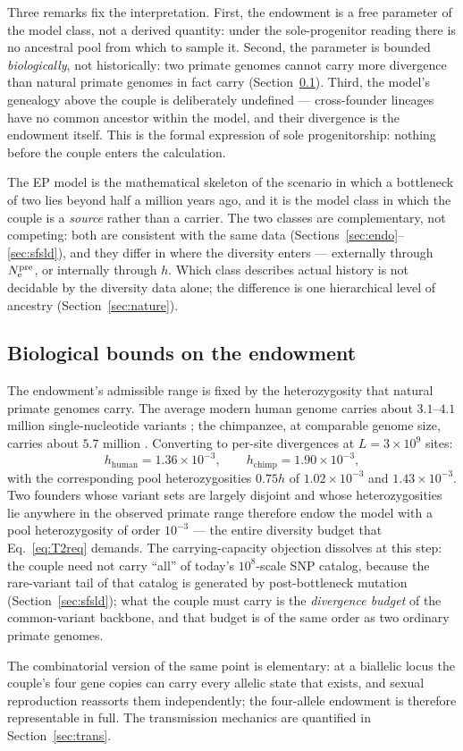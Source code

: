 Three remarks fix the interpretation. First, the endowment is a free
parameter of the model class, not a derived quantity: under the
sole-progenitor reading there is no ancestral pool from which to sample it.
Second, the parameter is bounded \emph{biologically}, not historically: two
primate genomes cannot carry more divergence than natural primate genomes
in fact carry (Section~\ref{sec:endocap}). Third, the model's genealogy
above the couple is deliberately undefined --- cross-founder lineages have
no common ancestor within the model, and their divergence is the endowment
itself. This is the formal expression of sole progenitorship: nothing
before the couple enters the calculation.

The EP model is the mathematical skeleton of the scenario in which a
bottleneck of two lies beyond half a million years ago, and
it is the model class in which the couple is a \emph{source} rather than a
carrier. The two classes are complementary, not competing: both are
consistent with the same data (Sections~\ref{sec:endo}--\ref{sec:sfsld}),
and they differ in where the diversity enters --- externally through
$N_{\mathrm{e}}^{\mathrm{pre}}$, or internally through $h$. Which class describes actual history
is not decidable by the diversity data alone; the difference is one
hierarchical level of ancestry (Section~\ref{sec:nature}).

\subsection{Biological bounds on the endowment}\label{sec:endocap}
The endowment's admissible range is fixed by the heterozygosity that
natural primate genomes carry. The average modern human genome carries
about $3.1$--$4.1$ million single-nucleotide variants
\citep{PradoMartinez2013,Auton2015}; the chimpanzee, at comparable genome
size, carries about $5.7$ million \citep{PradoMartinez2013}. Converting to
per-site divergences at $L = 3\times10^{9}$ sites:
\begin{equation}\label{eq:hbounds}
h_{\mathrm{human}} = 1.36\times10^{-3}, \qquad
h_{\mathrm{chimp}} = 1.90\times10^{-3},
\end{equation}
with the corresponding pool heterozygosities $0.75h$ of
$1.02\times10^{-3}$ and $1.43\times10^{-3}$. Two founders whose variant
sets are largely disjoint and whose heterozygosities lie anywhere in the
observed primate range therefore endow the model with a pool heterozygosity
of order $10^{-3}$ --- the entire diversity budget that
Eq.~\eqref{eq:T2req} demands. The carrying-capacity objection dissolves at
this step: the couple need not carry ``all'' of today's $10^8$-scale SNP
catalog, because the rare-variant tail of that catalog is generated by
post-bottleneck mutation (Section~\ref{sec:sfsld}); what the couple must
carry is the \emph{divergence budget} of the common-variant backbone, and
that budget is of the same order as two ordinary primate genomes.

The combinatorial version of the same point is elementary:
at a biallelic locus the couple's four gene copies can carry every allelic
state that exists, and sexual reproduction reassorts them independently;
the four-allele endowment is therefore representable in full. The
transmission mechanics are quantified in Section~\ref{sec:trans}.
